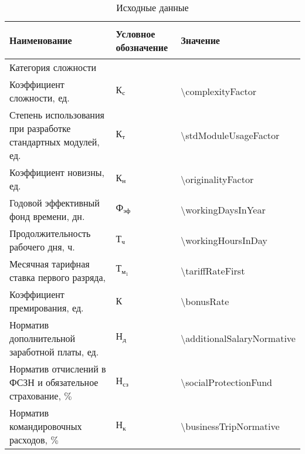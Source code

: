\begin{table}[!ht]
\caption{Исходные данные}
\label{table:econ:initial_data}
  \centering
  \begin{tabular}{| >{\raggedright}m{} 
                  | >{\centering}m{} 
                  | >{\centering\arraybackslash}m{}|}
    \hline
    {\begin{center}
      Наименование
    \end{center} } & Условное обозначение & Значение \\
    \hline
    Категория сложности & & 2 \\

    \hline
    Коэффициент сложности, ед. & $ \text{К}_\text{с} $ & \num{\complexityFactor} \\

    \hline
    Степень использования при разработке стандартных модулей, ед. & $ \text{К}_\text{т} $ & \num{\stdModuleUsageFactor} \\

    \hline
    Коэффициент новизны, ед. & $ \text{К}_\text{н} $ & \num{\originalityFactor} \\

    \hline
    Годовой эффективный фонд времени, дн. & $ \text{Ф}_\text{эф} $ & \num{\workingDaysInYear} \\

    \hline
    Продолжительность рабочего дня, ч. & $ \text{Т}_\text{ч} $ & \num{\workingHoursInDay} \\

    \hline
    Месячная тарифная ставка первого разряда, \byr{} & $ \text{Т}_{\text{м}_{1}}$ & \num{\tariffRateFirst} \\

    \hline
    Коэффициент премирования, ед. & $ \text{К} $ & \num{\bonusRate} \\

    \hline
    Норматив дополнительной заработной платы, ед. & $ \text{Н}_\text{д} $ & \num{\additionalSalaryNormative} \\

    \hline
    Норматив отчислений в ФСЗН и обязательное страхование, $\%$ & $ \text{Н}_\text{сз} $ & \num{\socialProtectionFund} \\

    \hline
    Норматив командировочных расходов, $\%$ & $ \text{Н}_\text{к} $ & \num{\businessTripNormative} \\


\end{tabular}
\end{table}
